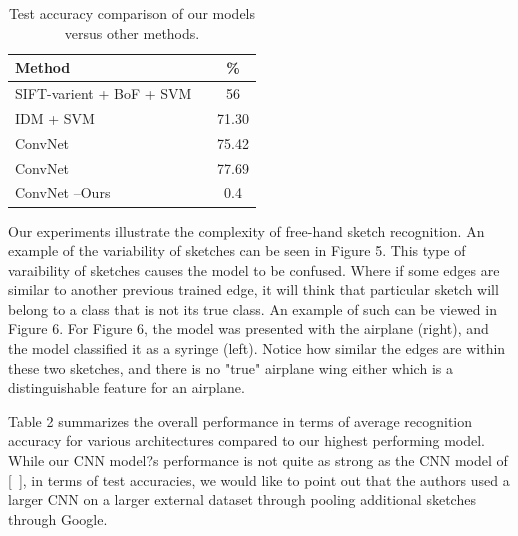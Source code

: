\documentclass[10pt,twocolumn,letterpaper]{article}
\begin{document}
\begin{table}[h]
\begin{center}
\begin{tabular}{|l|c|}
\hline
Method & \% \\
\hline\hline
SIFT-varient + BoF + SVM  ~\cite{eitz2012hdhso}  &  56 \\
IDM + SVM ~\cite{yesilbek2015svm} & 71.30 \\
ConvNet ~\cite{seddati2015deepsketch}  & 75.42\\
ConvNet ~\cite{seddati2016deepsketch} & 77.69\\
ConvNet --Ours & 0.4 \\
\hline
\end{tabular}
\end{center}
\caption{Test accuracy comparison of our models versus other methods.}
\end{table}

Our experiments illustrate the complexity of free-hand sketch recognition. An example of the variability of sketches can be seen in Figure 5. This type of varaibility of sketches causes the model to be confused. Where if some edges are similar to another previous trained edge, it will think that particular sketch will belong to a class that is not its true class. An example of such can be viewed in Figure 6. For Figure 6, the model was presented with the airplane (right), and the model classified it as a syringe (left). Notice how similar the edges are within these two sketches, and there is no "true" airplane wing either which is a distinguishable feature for an airplane. 

Table 2 summarizes the overall performance in terms of average recognition accuracy for various architectures compared to our highest performing model. While our CNN  model?s performance is not quite as strong as the CNN model of [~\cite{krizhevsky2012imagenet}], in terms of test accuracies, we would like to point out that the authors used a larger CNN on a larger external dataset through pooling additional sketches through Google. 
\end{document}
